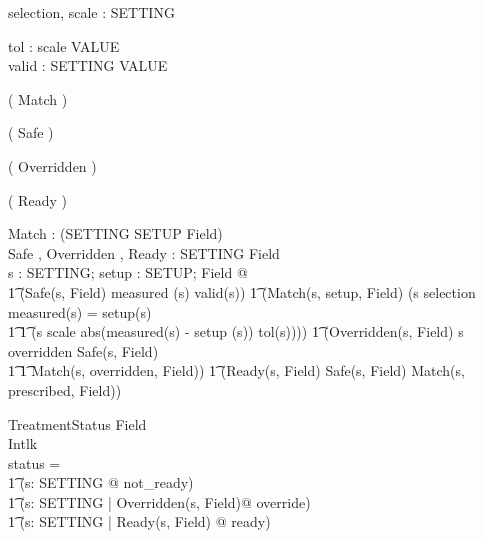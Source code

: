 \begin{axdef}
selection, scale : \power SETTING
\end{axdef}

\begin{axdef}
tol : scale \fun VALUE \\
valid : SETTING \fun \power VALUE
\end{axdef}

\begin{zed}
  \relation ( Match \varg )
\end{zed}

\begin{zed}
  \relation ( Safe \varg )
\end{zed}

\begin{zed}
  \relation ( Overridden \varg )
\end{zed}

\begin{zed}
  \relation ( Ready \varg )
\end{zed}

\begin{axdef}
Match \varg : \power(SETTING \cross SETUP \cross Field) \\
Safe \varg, Overridden \varg, Ready \varg : SETTING \rel Field \\
\where \forall s : SETTING; setup : SETUP; Field @ \\
\t1 (Safe(s, \theta Field) \iff measured (s) \in valid(s)) \land
\also
\t1 (Match(s, setup, \theta Field) \iff (s \in selection \land
measured(s) = setup(s) \lor \\
\t1 \t1 (s \in scale \land abs(measured(s) - setup (s)) \leq
tol(s))))\land
\also
\t1 (Overridden(s, \theta Field) \iff s \in \dom overridden \land
Safe(s, \theta Field) \land \\
\t1 \t1 Match(s, overridden, \theta Field)) \land
\also
\t1 (Ready(s, \theta Field) \iff Safe(s, \theta Field) \land
Match(s, prescribed, \theta Field))
\end{axdef}

\begin{schema}{TreatmentStatus}
Field \\
Intlk \\
\where status = \\
\t1 (\lambda s: SETTING @ not\_ready) \oplus \\
\t1 (\lambda s: SETTING | Overridden(s, \theta Field)@ override)
\oplus \\
\t1 (\lambda s: SETTING | Ready(s, \theta Field) @ ready)
\end{schema}

